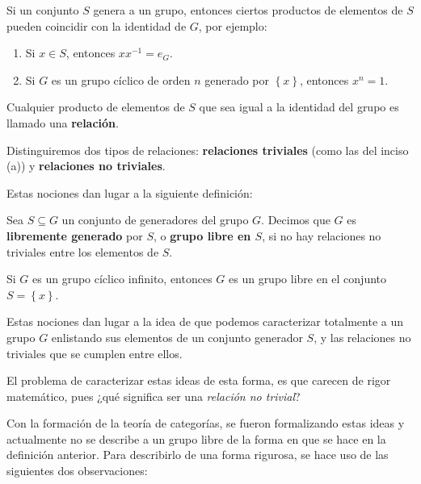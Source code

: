 \documentclass[12pt]{report}
\theoremstyle{largebreak}
\begin{document}
    Si un conjunto $S$ genera a un grupo, entonces ciertos productos de elementos de $S$ pueden coincidir con la identidad de $G$, por ejemplo:
    \renewcommand{\theenumi}{\alph{enumi}}
    \begin{enumerate}
        \item Si $x\in S$, entonces $xx^{-1}=e_G$.
        \item Si $G$ es un grupo cíclico de orden $n$ generado por $\left\{x\right\}$, entonces $x^n=1$.
    \end{enumerate}

    Cualquier producto de elementos de $S$ que sea igual a la identidad del grupo es llamado una \textbf{relación}.

    Distinguiremos dos tipos de relaciones: \textbf{relaciones triviales} (como las del inciso (a)) y \textbf{relaciones no triviales}.

    Estas nociones dan lugar a la siguiente definición:

    \begin{mydef}
        Sea $S\subseteq G$ un conjunto de generadores del grupo $G$. Decimos que $G$ es \textbf{libremente generado} por $S$, o \textbf{grupo libre en $S$}, si no hay relaciones no triviales entre los elementos de $S$.
    \end{mydef}

    \begin{exa}
        Si $G$ es un grupo cíclico infinito, entonces $G$ es un grupo libre en el conjunto $S=\left\{x \right\}$.
    \end{exa}

    Estas nociones dan lugar a la idea de que podemos caracterizar totalmente a un grupo $G$ enlistando sus elementos de un conjunto generador $S$, y las relaciones no triviales que se cumplen entre ellos.
    
    El problema de caracterizar estas ideas de esta forma, es que carecen de rigor matemático, pues ¿qué significa ser una \textit{relación no trivial}?

    Con la formación de la teoría de categorías, se fueron formalizando estas ideas y actualmente no se describe a un grupo libre de la forma en que se hace en la definición anterior. Para describirlo de una forma rigurosa, se hace uso de las siguientes dos observaciones:
\end{document}
